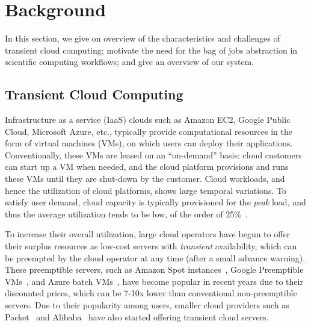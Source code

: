 \section{Background}

In this section, we give on overview of the characteristics and challenges of transient cloud computing; motivate the need for the bag of jobs abstraction in scientific computing workflows; and give an overview of our \sysname system. 

\vspace*{\subsecspace}
\subsection{Transient Cloud Computing}

Infrastructure as a service (IaaS) clouds such as Amazon EC2, Google Public Cloud, Microsoft Azure, etc., typically provide computational resources in the form of virtual machines (VMs), on which users can deploy their applications.
Conventionally, these VMs are leased on an ``on-demand'' basis: cloud customers can start up a VM when needed, and the cloud platform provisions and runs these VMs until they are shut-down by the customer. 
Cloud workloads, and hence the utilization of cloud platforms, shows large temporal variations.  
To satisfy user demand, cloud capacity is typically provisioned for the \emph{peak} load, and thus the average utilization tends to be low, of the order of 25\%~\cite{borg,resource-central-sosp17}. 


To increase their overall utilization, large cloud operators have begun to offer their surplus resources as low-cost servers with \emph{transient} availability, which can be preempted by the cloud operator at any time (after a small advance warning). 
These preemptible servers, such as Amazon Spot instances~\cite{ec2-spot}, Google Preemptible VMs~\cite{preemptible-documentation}, and Azure batch VMs~\cite{azure-batch}, have become popular in recent years due to their discounted prices, which can be 7-10x lower than conventional non-preemptible servers. 
Due to their popularity among users, smaller cloud providers such as Packet~\cite{packet-spot} and Alibaba~\cite{alibaba-spot} have also started offering transient cloud servers. 

